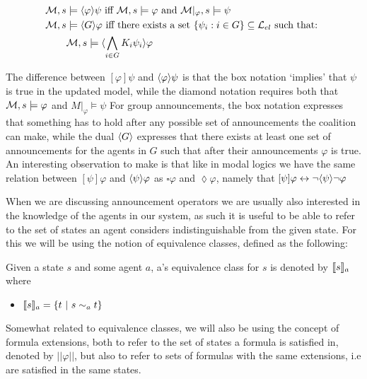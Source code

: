 \begin{definition} \hfill
	\label{def:dual}
	\begin{align*}
		\mathcal{M},s &\models \langle\varphi\rangle\psi\textrm{ iff }\mathcal{M},s \models \varphi\textrm{ and }\mathcal{M}|_\varphi,s \models \psi \\
		\mathcal{M},s &\models \langle G\rangle\varphi \textrm{ iff there exists a set }\{\psi_i:i\in G\} \subseteq \textrm{$\mathcal{L}_{el}$ such that: }\\
			   &\mathcal{M},s \models \langle\bigwedge_{i\in G}K_i\psi_i\rangle\varphi
	\end{align*}

\end{definition}

The difference between $[\varphi]\psi$ and $\langle\varphi\rangle\psi$ is that the box notation `implies' that $\psi$ is true in the updated model,  while the diamond notation requires both that $\mathcal{M},s\models \varphi$ and $M|_\varphi \models \psi$ For group announcements, the box notation expresses that something has to hold after any possible set of announcements the coalition can make, while the dual $\langle G\rangle$ expresses that there exists at least one set of announcements for the agents in $G$ such that after their announcements $\varphi$ is true. An interesting observation to make is that like in modal logics we have the same relation between $[\psi]\varphi$ and $\langle\psi\rangle\varphi$ as $\square\varphi$ and $\lozenge\varphi$, namely that $[\psi]\varphi \leftrightarrow \neg\langle\psi\rangle\neg\varphi$

When we are discussing announcement operators we are usually also interested in the knowledge of the agents in our system, as such it is useful to be able to refer to the set of states an agent considers indistinguishable from the given state. For this we will be using the notion of equivalence classes, defined as the following:

\begin{definition}
	\label{def:eqclass}
	Given a state $s$ and some agent $a$, a's equivalence class for $s$ is denoted by $\llbracket s\rrbracket_a$ where
	\begin{itemize}
		\item[] $\llbracket s\rrbracket_a = \{t~|~s\sim_a t\}$
	\end{itemize}
\end{definition}

Somewhat related to equivalence classes, we will also be using the concept of formula extensions, both to refer to the set of states a formula is satisfied in, denoted by $||\varphi||$, but also to refer to sets of formulas with the same extensions, i.e are satisfied in the same states.

